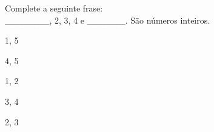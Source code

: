 \question[10]
Complete a seguinte frase:\\
_______, 2, 3, 4 e ______. São números inteiros.
\\
\begin{choices}
\item 1, 5 %
\item 4, 5 
\item 1, 2 
\item 3, 4 
\item 2, 3
\end{choices}
\answerline

